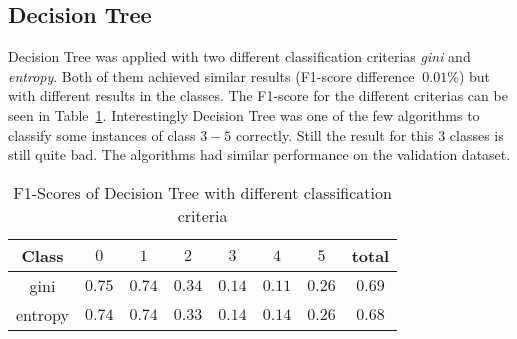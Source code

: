 \subsection{Decision Tree}
Decision Tree was applied with two different classification criterias \textit{gini} and \textit{entropy}. Both of them achieved similar results (F1-score difference $~0.01\%$) but with different results in the classes. The F1-score for the different criterias can be seen in Table~\ref{ds2:table:dtf1}. Interestingly Decision Tree was one of the few algorithms to classify some instances of class $3-5$ correctly. Still the result for this $3$ classes is still quite bad. The algorithms had similar performance on the validation dataset.
\begin{table}[p]
	\begin{center}
		\begin{tabular}{|c|c|c|c|c|c|c|c|}
\hline Class & $0$ & $1$ & $2$ & $3$ &$4$  &$ 5$ & total \\
\hline gini & $0.75$ &$0.74$ &$0.34$ &$0.14$&$0.11$&$0.26$&$0.69$\\
\hline entropy & $0.74$&$0.74$&$0.33$&$0.14$&$0.14$&$0.26$&$0.68$\\
\hline
	\end{tabular}


	\end{center}
	\caption{F1-Scores of Decision Tree with different classification criteria\label{ds2:table:dtf1}}
\end{table}
